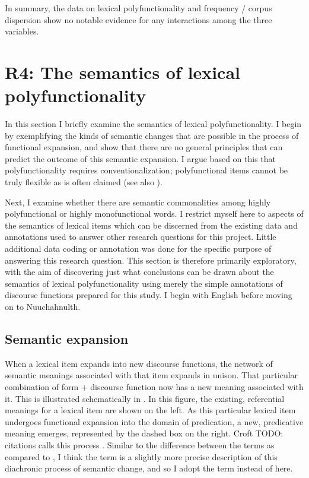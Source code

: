 In summary, the data on lexical polyfunctionality and frequency / corpus dispersion show no notable evidence for any interactions among the three variables.

\section{R4: The semantics of lexical polyfunctionality}
\label{sec:4.6}

In this section I briefly examine the semantics of lexical polyfunctionality. I begin by exemplifying the kinds of semantic changes that are possible in the process of functional expansion, and show that there are no general principles that can predict the outcome of this semantic expansion. I argue based on this that polyfunctionality requires conventionalization; polyfunctional items cannot be truly flexible as is often claimed (see also ).

Next, I examine whether there are semantic commonalities among highly polyfunctional or highly monofunctional words. I restrict myself here to aspects of the semantics of lexical items which can be discerned from the existing data and annotations used to answer other research questions for this project. Little additional data coding or annotation was done for the specific purpose of answering this research question. This section is therefore primarily exploratory, with the aim of discovering just what conclusions can be drawn about the semantics of lexical polyfunctionality using merely the simple annotations of discourse functions prepared for this study. I begin with English before moving on to Nuuchahnulth.

\subsection{Semantic expansion}
\label{sec:4.6.1}

When a lexical item expands into new discourse functions, the network of semantic meanings associated with that item expands in unison. That particular combination of form + discourse function now has a new meaning associated with it. This is illustrated schematically in . In this figure, the existing, referential meanings for a lexical item are shown on the left. As this particular lexical item undergoes functional expansion into the domain of predication, a new, predicative meaning emerges, represented by the dashed box on the right. Croft {{TODO: citations}} calls this process . Similar to the difference between the terms  as compared to , I think the term  is a slightly more precise description of this diachronic process of semantic change, and so I adopt the term  instead of  here.

